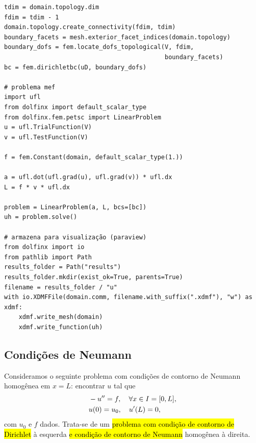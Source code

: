 \begin{ex}
\begin{lstlisting}[caption=ex\_mef1d\_dirichlet.py]
tdim = domain.topology.dim
fdim = tdim - 1
domain.topology.create_connectivity(fdim, tdim)
boundary_facets = mesh.exterior_facet_indices(domain.topology)
boundary_dofs = fem.locate_dofs_topological(V, fdim,
                                            boundary_facets)
bc = fem.dirichletbc(uD, boundary_dofs)

# problema mef
import ufl
from dolfinx import default_scalar_type
from dolfinx.fem.petsc import LinearProblem
u = ufl.TrialFunction(V)
v = ufl.TestFunction(V)

f = fem.Constant(domain, default_scalar_type(1.))

a = ufl.dot(ufl.grad(u), ufl.grad(v)) * ufl.dx
L = f * v * ufl.dx

problem = LinearProblem(a, L, bcs=[bc])
uh = problem.solve()

# armazena para visualização (paraview)
from dolfinx import io
from pathlib import Path
results_folder = Path("results")
results_folder.mkdir(exist_ok=True, parents=True)
filename = results_folder / "u"
with io.XDMFFile(domain.comm, filename.with_suffix(".xdmf"), "w") as xdmf:
    xdmf.write_mesh(domain)
    xdmf.write_function(uh)
\end{lstlisting}
\end{ex}

\subsection{Condições de Neumann}

Consideramos o seguinte problema com condições de contorno de Neumann{\neumann} homogênea em $x=L$: encontrar $u$ tal que
\begin{align}\hleq
  &-u'' = f,\quad \forall x\in I=[0, L],\label{eq:cc_n_eq}\\
  &u(0) = u_0,\quad u'(L) = 0,\label{eq:cc_n_bc}
\end{align}
com $u_0$ e $f$ dados. Trata-se de um \hl{problema com condição de contorno de Dirichlet} à esquerda \hl{e condição de contorno de Neumann}{\neumann} homogênea à direita.

